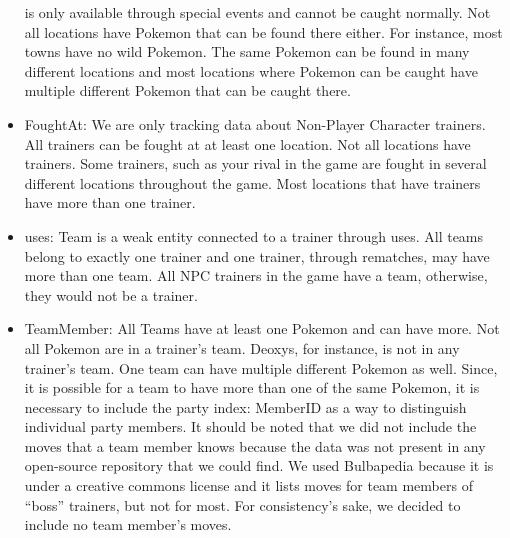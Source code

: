 \documentclass{article}
\begin{document}
\begin{itemize}
		is only available through special events and cannot be caught normally.
		Not all locations have Pokemon that can be found there either. 
		For instance, most towns have no wild Pokemon.
		The same Pokemon can be found in many different locations and
		most locations where Pokemon can be caught have multiple 
		different Pokemon that can be caught there.
	\item FoughtAt:
		We are only tracking data about Non-Player Character trainers.
		All trainers can be fought at at least one location.
		Not all locations have trainers. Some trainers, such as your
		rival in the game are fought in several different locations
		throughout the game.
		Most locations that have trainers have more than one trainer.
	\item uses:
		Team is a weak entity connected to a trainer through uses.
		All teams belong to exactly one trainer and one trainer,
		through rematches, may have more than one team.
		All NPC trainers in the game have a team,
		otherwise, they would not be a trainer.
	\item TeamMember:
		All Teams have at least one Pokemon and can have more.
		Not all Pokemon are in a trainer's team. Deoxys, for instance, is not
		in any trainer's team.
		One team can have multiple different Pokemon as well.
		Since, it is possible for a team to have more than one 
		of the same Pokemon, it is necessary to include the
		party index: MemberID as a way to distinguish 
		individual party members.
		It should be noted that we did not include 
		the moves that a team member knows because
		the data was not present in any open-source
		repository that we could find.
		We used Bulbapedia because it is under
		a creative commons license and it lists
		moves for team members of ``boss'' trainers,
		but not for most. For consistency's sake, we decided to include no
		team member's moves.
\end{itemize}
\end{document}
